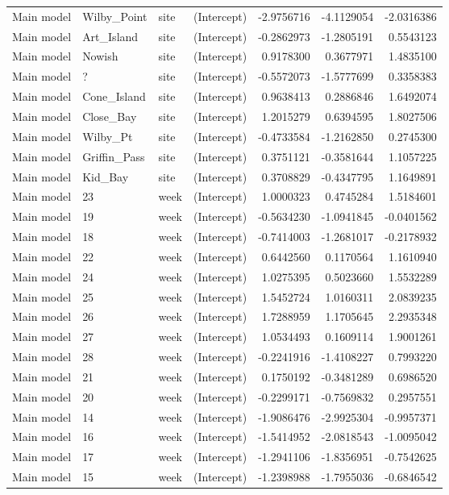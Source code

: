 \begin{longtable}
\begin{tabular}[t]{llllrrr}
Main model & Wilby_Point & site & (Intercept) & -2.9756716 & -4.1129054 & -2.0316386\\
Main model & Art_Island & site & (Intercept) & -0.2862973 & -1.2805191 & 0.5543123\\
\addlinespace
Main model & Nowish & site & (Intercept) & 0.9178300 & 0.3677971 & 1.4835100\\
Main model & ? & site & (Intercept) & -0.5572073 & -1.5777699 & 0.3358383\\
Main model & Cone_Island & site & (Intercept) & 0.9638413 & 0.2886846 & 1.6492074\\
Main model & Close_Bay & site & (Intercept) & 1.2015279 & 0.6394595 & 1.8027506\\
Main model & Wilby_Pt & site & (Intercept) & -0.4733584 & -1.2162850 & 0.2745300\\
\addlinespace
Main model & Griffin_Pass & site & (Intercept) & 0.3751121 & -0.3581644 & 1.1057225\\
Main model & Kid_Bay & site & (Intercept) & 0.3708829 & -0.4347795 & 1.1649891\\
Main model & 23 & week & (Intercept) & 1.0000323 & 0.4745284 & 1.5184601\\
Main model & 19 & week & (Intercept) & -0.5634230 & -1.0941845 & -0.0401562\\
Main model & 18 & week & (Intercept) & -0.7414003 & -1.2681017 & -0.2178932\\
\addlinespace
Main model & 22 & week & (Intercept) & 0.6442560 & 0.1170564 & 1.1610940\\
Main model & 24 & week & (Intercept) & 1.0275395 & 0.5023660 & 1.5532289\\
Main model & 25 & week & (Intercept) & 1.5452724 & 1.0160311 & 2.0839235\\
Main model & 26 & week & (Intercept) & 1.7288959 & 1.1705645 & 2.2935348\\
Main model & 27 & week & (Intercept) & 1.0534493 & 0.1609114 & 1.9001261\\
\addlinespace
Main model & 28 & week & (Intercept) & -0.2241916 & -1.4108227 & 0.7993220\\
Main model & 21 & week & (Intercept) & 0.1750192 & -0.3481289 & 0.6986520\\
Main model & 20 & week & (Intercept) & -0.2299171 & -0.7569832 & 0.2957551\\
Main model & 14 & week & (Intercept) & -1.9086476 & -2.9925304 & -0.9957371\\
Main model & 16 & week & (Intercept) & -1.5414952 & -2.0818543 & -1.0095042\\
\addlinespace
Main model & 17 & week & (Intercept) & -1.2941106 & -1.8356951 & -0.7542625\\
Main model & 15 & week & (Intercept) & -1.2398988 & -1.7955036 & -0.6846542\\
\bottomrule
\end{tabular}
\label{SI-leps-all-ranefs}
\label{SI-leps-all-ranefs}
\end{longtable}
